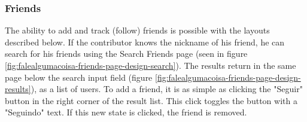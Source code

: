 \subsubsection{Friends}

The ability to add and track (follow) friends is possible with the layouts described below. If the contributor knows the nickname of his friend, he can search for his friends using the Search Friends page (seen in figure \ref{fig:falealgumacoisa-friends-page-design-search}). The results return in the same page below the search input field (figure \ref{fig:falealgumacoisa-friends-page-design-results}), as a list of users. To add a friend, it is as simple as clicking the "Seguir" button in the right corner of the result list. This click toggles the button with a "Seguindo" text. If this new state is clicked, the friend is removed.

